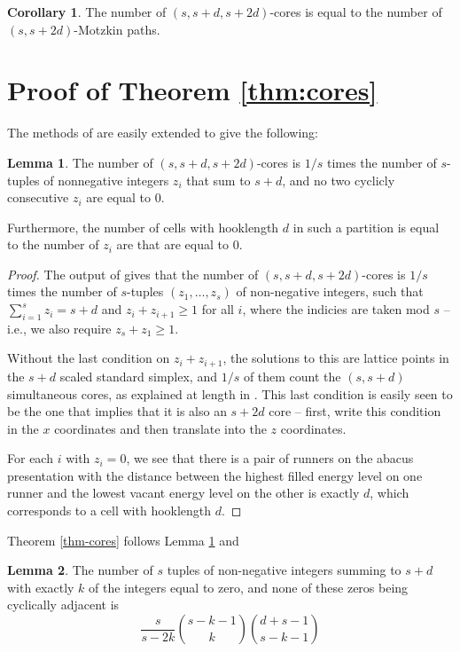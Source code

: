 \documentclass{amsart}
\theoremstyle{definition}
\newtheorem{lemma}{Lemma}
\newtheorem{corollary}{Corollary}
\begin{document}
\begin{corollary}
The number of $(s,s+d,s+2d)$-cores is equal to the number of $(s,s+2d)$-Motzkin paths.
\end{corollary}



\section{Proof of Theorem \ref{thm:cores}}

The methods of \cite{johnson} are easily extended to give the following:
\begin{lemma} \label{lem-lattice}
The number of $(s,s+d,s+2d)$-cores is $1/s$ times the number of $s$-tuples of nonnegative integers $z_i$ that sum to $s+d$, and no two cyclicly consecutive $z_i$ are equal to 0.

Furthermore, the number of cells with hooklength $d$ in such a partition is equal to the number of $z_i$ are that are equal to 0.
\end{lemma}
\begin{proof}
The output of \cite{johnson} gives that the number of $(s,s+d,s+2d)$-cores is $1/s$ times the number of $s$-tuples $(z_1,\dots,z_s)$ of non-negative integers, such that $\sum_{i=1}^s z_i=s+d$ and $z_i+z_{i+1}\geq 1$ for all $i$, where the indicies are taken mod $s$ -- i.e., we also require $z_s+z_1\geq 1$.

Without the last condition on $z_i+z_{i+1}$, the solutions to this are lattice points in the $s+d$ scaled standard simplex, and $1/s$ of them count the $(s,s+d)$ simultaneous cores, as explained at length in \cite{Johnson}.   This last condition is easily seen to be the one that implies that it is also an $s+2d$ core -- first, write this condition in the $x$ coordinates and then translate into the $z$ coordinates.

For each $i$ with $z_i=0$, we see that there is a pair of runners on the abacus presentation with the distance between the highest filled energy level on one runner and the lowest vacant energy level on the other is exactly $d$, which corresponds to a cell with hooklength $d$.    
\end{proof}



Theorem \ref{thm-cores} follows Lemma \ref{lem-lattice} and
\begin{lemma}
The number of $s$ tuples of non-negative integers summing to $s+d$ with exactly $k$ of the integers equal to zero, and none of these zeros being cyclically adjacent is 
$$\frac{s}{s-2k}\binom{s-k-1}{k}\binom{d+s-1}{s-k-1}$$
\end{lemma}
\end{document}
